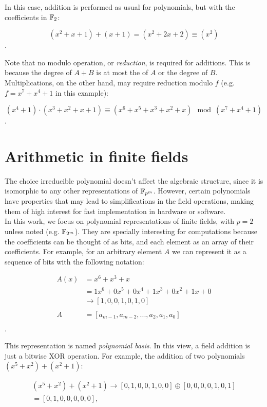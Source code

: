 In this case, addition is performed as usual for polynomials, but with the coefficients in $\mathbb{F}_2$:

$$(x^2+x+1) + (x+1) = (x^2+2x+2) \equiv (x^2)$$.

Note that no modulo operation, or \emph{reduction}, is required for additions. This is because the degree of $A+B$ is at most the of $A$ or the degree of $B$. Multiplications, on the other hand, may require reduction modulo $f$ (e.g. $f=x^7+x^4+1$ in this example):

$$(x^4+1) \cdot (x^3+x^2+x+1) \equiv (x^6+x^5+x^3+x^2+x) \mod (x^7+x^4+1)$$.

\section{Arithmetic in finite fields} \label{background:arithmetic}

The choice irreducible polynomial doesn't affect the algebraic structure, since it is isomorphic to any other representations of $\mathbb{F}_{p^m}$. However, certain polynomials have properties that may lead to simplifications in the field operations, making them of high interest for fast implementation in hardware or software.\\

In this work, we focus on polynomial representations of finite fields, with $p=2$ unless noted (e.g. $\mathbb{F}_{2^m}$). They are specially interesting for computations because the coefficients can be thought of as bits, and each element as an array of their coefficients. For example, for an arbitrary element $A$ we can represent it as a sequence of bits with the following notation:

\begin{align*}
A(x) &= x^6+x^3+x \\
& = 1x^6+0x^5+0x^4+1x^3+0x^2+1x+0\\
& \rightarrow [1, 0, 0, 1, 0, 1, 0] \\
\\
A &= [a_{m-1}, a_{m-2}, ..., a_2, a_1, a_0] \\
\end{align*}.

This representation is named \emph{polynomial basis}. In this view, a field addition is just a bitwise XOR operation. For example, the addition of two polynomials $(x^5+x^2)+(x^2+1)$:

\begin{gather*}
(x^5+x^2)+(x^2+1) \rightarrow [0, 1, 0, 0, 1, 0, 0] \oplus [0, 0, 0, 0, 1, 0, 1] \\
= [0, 1, 0, 0, 0, 0, 0],
\end{gather*}

